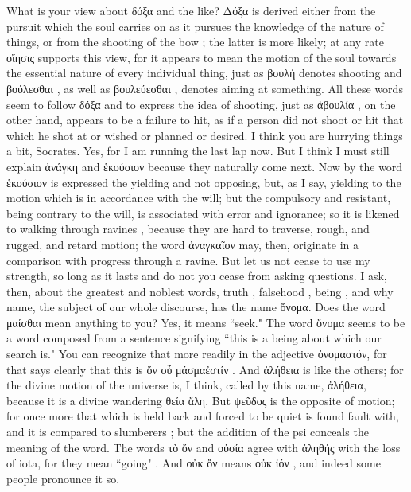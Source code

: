 {{{{{\hermogenesspeaks
What is your view about δόξα  and the like?
\socratesspeaks
Δόξα is derived either from the pursuit  which the soul carries on as it pursues the knowledge of the nature of things, or from the shooting of the bow ; the latter is more likely; at any rate οἴησις  supports this view,  for it appears to mean the motion  of the soul towards the essential nature of every individual thing, just as βουλή  denotes shooting  and βούλεσθαι , as well as βουλεύεσθαι , denotes aiming at something. All these words seem to follow δόξα and to express the idea of shooting, just as ἀβουλία , on the other hand, appears to be a failure to hit, as if a person did not shoot or hit that which he shot at or wished or planned or desired. 
\hermogenesspeaks
I think you are hurrying things a bit, Socrates.
\socratesspeaks
Yes, for I am running the last lap now. But I think I must still explain ἀνάγκη  and ἑκούσιον because they naturally come next. Now by the word ἑκούσιον is expressed the yielding  and not opposing, but, as I say, yielding to the motion which is in accordance with the will; but the compulsory  and resistant, being contrary to the will, is associated with error and ignorance; so it is likened to walking through ravines ,  because they are hard to traverse, rough, and rugged, and retard motion; the word ἀναγκαῖον may, then, originate in a comparison with progress through a ravine. But let us not cease to use my strength, so long as it lasts and do not you cease from asking questions.
\hermogenesspeaks
I ask, then, about the greatest and noblest words,  truth , falsehood , being , and why name, the subject of our whole discourse, has the name ὄνομα.
\socratesspeaks
Does the word μαίσθαι  mean anything to you?
\hermogenesspeaks
Yes, it means ``seek."
\socratesspeaks
The word ὄνομα seems to be a word composed from a sentence signifying ``this is a being about which our search is." You can recognize that more readily in the adjective ὀνομαστόν, for that says clearly that this is  ὄν οὗ μάσμαἐστίν . And ἀλήθεια  is like the others; for the divine motion of the universe is, I think, called by this name, ἀλήθεια, because it is a divine wandering θεία ἄλη. But ψεῦδος  is the opposite of motion; for once more that which is held back and forced to be quiet is found fault with, and it is compared to slumberers ; but the addition of the psi conceals the meaning of the word. The words τὸ ὄν and οὐσία  agree with ἀληθής with the loss of iota, for they mean ``going" . And οὐκ ὄν  means οὐκ ἰόν ,  and indeed some people pronounce it so.
}}}}}
